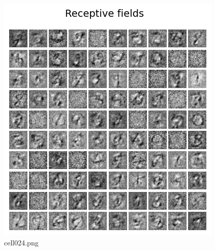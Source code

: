 \begin{figure}[ht]
	\centering
	\includegraphics[scale=0.8, max width=\linewidth]{./fig/energy-based-model/boltzmann-machine/cell024.png}
	\caption{cell024.png}
	\label{cell024.png}
\end{figure}
